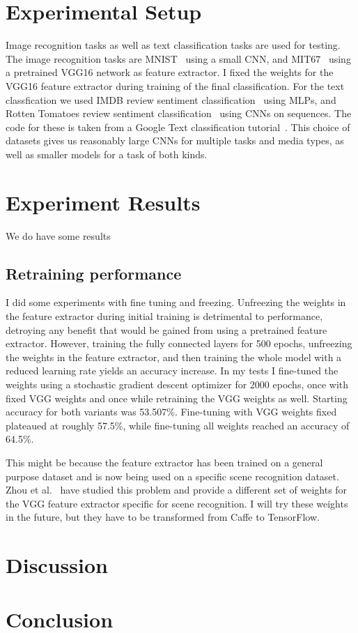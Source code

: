 \documentclass[11pt]{article}
\begin{document}
\section{Experimental Setup}
\label{sec:setup}

Image recognition tasks as well as text classification tasks are used for testing.
The image recognition tasks are MNIST~\cite{noauthor_mnist_nodate} using a small CNN, and MIT67~\cite{quattoni_recognizing_nodate} using a pretrained VGG16 network as feature extractor.
I fixed the weights for the VGG16 feature extractor during training of the final classification.
For the text classfication we used IMDB review sentiment classification~\cite{maas_learning_2011} using MLPs, and Rotten Tomatoes review sentiment classification~\cite{noauthor_sentiment_nodate} using CNNs on sequences.
The code for these is taken from a Google Text classification tutorial~\cite{noauthor_googleeng-edu_nodate}.
This choice of datasets gives us reasonably large CNNs for multiple tasks and media types, as well as smaller models for a task of both kinds.

\section{Experiment Results}
\label{sec:results}

We do have some results

\subsection{Retraining performance}

I did some experiments with fine tuning and freezing.
Unfreezing the weights in the feature extractor during initial training is detrimental to performance, detroying any benefit that would be gained from using a pretrained feature extractor.
However, training the fully connected layers for 500 epochs, unfreezing the weights in the feature extractor, and then training the whole model with a reduced learning rate yields an accuracy increase.
In my tests I fine-tuned the weights using a stochastic gradient descent optimizer for 2000 epochs, once with fixed VGG weights and once while retraining the VGG weights as well.
Starting accuracy for both variants was 53.507\%.
Fine-tuning with VGG weights fixed plateaued at roughly 57.5\%, while fine-tuning all weights reached an accuracy of 64.5\%.

This might be because the feature extractor has been trained on a general purpose dataset and is now being used on a specific scene recognition dataset.
Zhou et al.~\cite{zhou_learning_2014} have studied this problem and provide a different set of weights for the VGG feature extractor specific for scene recognition.
I will try these weights in the future, but they have to be transformed from Caffe to TensorFlow.

\section{Discussion}
\label{sec:discussion}

\section{Conclusion}
\label{sec:conclusion}



\end{document}
